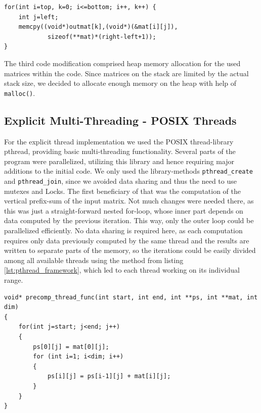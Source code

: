 \documentclass[conference]{IEEEtran}
\begin{document}
\begin{center}
   \begin{lstlisting}[captionpos=b, caption=Optimized Implementation: Initialize Output Matrix, label=lst:outmat-opt]  
for(int i=top, k=0; i<=bottom; i++, k++) {                                       
    int j=left;                                                                                    
    memcpy((void*)outmat[k],(void*)(&mat[i][j]),
            sizeof(**mat)*(right-left+1));                                          
}                                                 
   \end{lstlisting}
\end{center}
   
The third code modification comprised heap memory allocation for the used matrices within the code. Since matrices on the stack are limited by the actual stack size, we decided to allocate enough memory on the heap with help of \texttt{malloc()}.

   
\subsection{Explicit Multi-Threading - POSIX Threads}
\label{sec:impl:pthread}

For the explicit thread implementation we used the POSIX thread-library pthread, providing basic multi-threading functionality. Several parts of the program were parallelized, utilizing this library and hence requiring major additions to the initial code. We only used the library-methods \texttt{pthread\_create} and \texttt{pthread\_join}, since we avoided data sharing and thus the need to use mutexes and Locks.
The first beneficiary of that was the computation of the vertical prefix-sum of the input matrix. Not much changes were needed there, as this was just a straight-forward nested for-loop, whose inner part depends on data computed by the previous iteration. This way, only the outer loop could be parallelized efficiently. No data sharing is required here, as each computation requires only data previously computed by the same thread and the results are written to separate parts of the memory, so the iterations could be easily divided among all available threads using the method from listing \ref{lst:pthread_framework}, which led to each thread working on its individual range.

\begin{center}
   \begin{lstlisting}[captionpos=b, caption=pthread: Parallel Matrix Pre-Computation of the Vertical Sum (simplified) - the variables \texttt{start} and \texttt{end} are used to equally divide the work among all available threads and to specify where the work of a thread begins and ends., label=lst:pthread_precomp]
void* precomp_thread_func(int start, int end, int **ps, int **mat, int dim)
{
    for(int j=start; j<end; j++)
    {
        ps[0][j] = mat[0][j];
        for (int i=1; i<dim; i++)
        {
            ps[i][j] = ps[i-1][j] + mat[i][j];
        }
    }
}
   \end{lstlisting}
\end{center}
\end{document}
